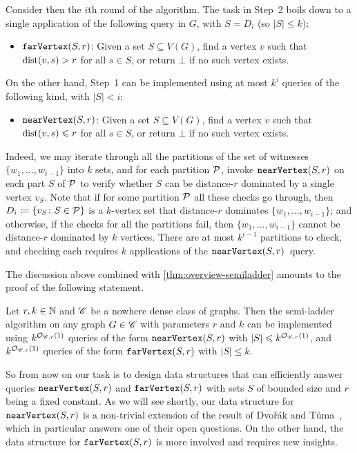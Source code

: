 Consider then the $i$th round of the algorithm. The task in Step~2 boils down to a single application of the following query in $G$, with $S=D_i$ (so $|S|\leq k$):
\begin{itemize}
	\item $\mathtt{farVertex}(S,r)$: Given a set $S\subseteq V(G)$, find a vertex $v$ such that $\mathrm{dist}(v,s)>r$ for all $s\in S$, or return $\bot$ if no such vertex exists.
\end{itemize}
On the other hand, Step~1 can be implemented using at most $k^i$ queries of the following kind, with $|S|<i$:
\begin{itemize}
	\item $\mathtt{nearVertex}(S,r)$: Given a set $S\subseteq V(G)$, find a vertex $v$ such that $\mathrm{dist}(v,s)\leqslant r$ for all $s\in S$, or return $\bot$ if no such vertex exists.
\end{itemize}
Indeed, we may iterate through all the partitions of the set of witnesses $\{w_1,\ldots,w_{i-1}\}$ into $k$ sets, and for each partition $\mathcal{P}$, invoke $\mathtt{nearVertex}(S,r)$ on each part $S$ of $\mathcal{P}$ to verify whether $S$ can be \mbox{distance-$r$} dominated by a single vertex $v_S$. Note that if for some partition $\mathcal{P}$ all these checks go through, then $D_i\coloneqq \{v_S\colon S\in \mathcal{P}\}$ is a $k$-vertex set that distance-$r$ dominates $\{w_1,\ldots,w_{i-1}\}$; and otherwise, if the checks for all the partitions fail, then $\{w_1,\ldots,w_{i-1}\}$ cannot be distance-$r$ dominated by $k$ vertices. There are at most $k^{i-1}$ partitions to check, and checking each requires $k$ applications of the $\mathtt{nearVertex}(S,r)$~query.

The discussion above combined with \cref{thm:overview-semiladder} amounts to the proof of the following statement.

\begin{proposition}\label{prop:overview-reduction}
	Let $r,k\in \mathbb{N}$ and $\mathscr C$ be a nowhere dense class of graphs. Then the semi-ladder algorithm on any graph $G\in \mathscr C$ with parameters $r$ and $k$ can be implemented using $k^{\mathcal{O}_{\mathscr C,r}(1)}$ queries of the form $\mathtt{nearVertex}(S,r)$ with $|S|\leqslant k^{\mathcal{O}_{\mathscr C,r}(1)}$, and $k^{\mathcal{O}_{\mathscr C,r}(1)}$ queries of the form $\mathtt{farVertex}(S,r)$ with $|S|\leq k$.
\end{proposition}

So from now on our task is to design data structures that can efficiently answer queries $\mathtt{nearVertex}(S,r)$ and $\mathtt{farVertex}(S,r)$ with sets $S$ of bounded size and $r$ being a fixed constant. As we will see shortly, our data structure for $\mathtt{nearVertex}(S,r)$ is a non-trivial extension of the result of Dvo\v{r}\'ak and T\r{u}ma~\cite{DvorakT13}, which in particular answers one of their open questions. On the other hand, the data structure for $\mathtt{farVertex}(S,r)$ is more involved and requires new insights.

